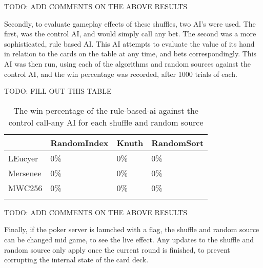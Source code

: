TODO: ADD COMMENTS ON THE ABOVE RESULTS

Secondly, to evaluate gameplay effects of these shuffles, two AI's were used.
The first, was the control AI, and would simply call any bet. The second
was a more sophisticated, rule based AI. This AI attempts to evaluate the value
of its hand in relation to the cards on the table at any time, and bets
correspondingly. This AI was then run, using each of the algorithms and
random sources against the control AI, and the win percentage was recorded,
after 1000 trials of each.

TODO: FILL OUT THIS TABLE

\begin{table}[h]
    \centering
    \begin{tabular}{l l l l}
    \toprule
                & RandomIndex   & Knuth & RandomSort  \\
    \midrule
    LEucyer     & 0\%           & 0\%   & 0\%         \\ \addlinespace
    Mersenee    & 0\%           & 0\%   & 0\%         \\ \addlinespace
    MWC256      & 0\%           & 0\%   & 0\%         \\ \addlinespace
    \bottomrule
    \end{tabular}
    \caption{The win percentage of the rule-based-ai against the control
             call-any AI for each shuffle and random source}
\end{table}

TODO: ADD COMMENTS ON THE ABOVE RESULTS

Finally, if the poker server is launched with a flag, the shuffle and random
source can be changed mid game, to see the live effect. Any updates to the
shuffle and random source only apply once the current round is finished, to
prevent corrupting the internal state of the card deck.
